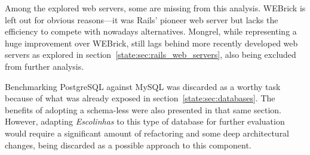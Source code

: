 Among the explored web servers, some are missing from this analysis. WEBrick is left out for obvious reasons---it was Rails' pioneer web server but lacks the efficiency to compete with nowadays alternatives. Mongrel, while representing a huge improvement over WEBrick, still lags behind more recently developed web servers as explored in section~\ref{state:sec:rails_web_servers}, also being excluded from further analysis.

Benchmarking PostgreSQL against MySQL was discarded as a worthy task because of what was already exposed in section~\ref{state:sec:databases}. The benefits of adopting a schema-less were also presented in that same section. However, adapting \textit{Escolinhas} to this type of database for further evaluation would require a significant amount of refactoring and some deep architectural changes, being discarded as a possible approach to this component.


